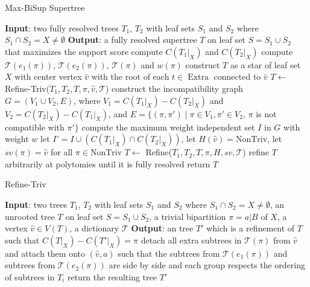 \documentclass{bmcart}
\newcommand{\triv}{\mathrm{Triv}}
\newcommand{\ntriv}{\mathrm{NonTriv}}
\DeclareMathOperator*{\extra}{Extra}
\begin{document}
\begin{algorithm}
    \caption{Max-BiSup Supertree}%
    \label{alg:maxbisup}
    \begin{algorithmic}[1]
        \Statex \textbf{Input}: two fully resolved trees $T_1$, $T_2$ with leaf sets $S_1$ and $S_2$ where $S_1 \cap S_2 = X \neq \emptyset$ 
        \Statex \textbf{Output}: a fully resolved supertree $T$ on leaf set $S = S_1 \cup S_2$ that maximizes the support score
        \State compute $C(T_1|_X)$ and $C(T_2|_X)$
            \State compute $\mathcal{T}(e_1(\pi))$, $\mathcal{T}(e_2(\pi))$, $\mathcal{T}(\pi)$ and $w(\pi)$
        \EndFor
        \State construct $T$ as a star of leaf set $X$ with center vertex $\hat{v}$ with the root of each $t \in \extra$ connected to $\hat{v}$         
        \For{each $\pi \in \triv$}
            \State $T \gets $ Refine-Triv($T_1, T_2, T, \pi, \hat{v}, \mathcal{T}$) 
        \EndFor 
        \State construct the incompatibility graph $G = (V_1 \cup V_2, E)$, where $V_1 = C(T_1|_X)- C(T_2|_X)$ and $V_2 = C(T_2|_X) - C(T_1|_X)$, and $E = \{(\pi, \pi') \mid \pi \in V_1, \pi' \in V_2$, $\pi$ is not compatible with $\pi'\}$
        \State compute the maximum weight independent set $I$ in $G$ with weight $w$
        \State let $I' = I \cup (C(T_1|_X) \cap C(T_2|_X))$, let $H(\hat{v}) = \ntriv $, let $sv(\pi) = \hat{v}$ for all $\pi \in \ntriv$
        \For{each $\pi \in \ntriv \cap I'$}
            \State $T \gets $ Refine($T_1,T_2, T, \pi, H, sv, \mathcal{T}$) 
        \EndFor
        \State refine $T$ arbitrarily at polytomies until it is fully resolved
        \State return $T$
    \end{algorithmic}
\end{algorithm}

\begin{algorithm}
    \caption{Refine-Triv} \label{alg:trivial_refine}

    \begin{algorithmic}[1]
        \Statex \textbf{Input}: two trees $T_1$, $T_2$ with leaf sets $S_1$ and $S_2$ where $S_1 \cap S_2 = X \neq \emptyset$, an unrooted tree $T$ on leaf set $S = S_1 \cup S_2$, a trivial bipartition $\pi = a|B$ of $X$, a vertex $\hat{v} \in V(T)$, a dictionary $\mathcal{T}$
        \Statex \textbf{Output}: an tree $T'$ which is a refinement of $T$ such that $C(T|_X) - C(T'|_X) = \pi$ 
        \State detach all extra subtrees in $\mathcal{T}(\pi)$ from $\hat{v}$ and attach them onto $(\hat{v},a)$ such that the subtrees from $\mathcal{T}(e_1(\pi))$ and subtrees from $\mathcal{T}(e_2(\pi))$ are side by side and each group respects the ordering of subtrees in $T_i$
        \State return the resulting tree $T'$
    \end{algorithmic}
\end{algorithm}
\end{document}
